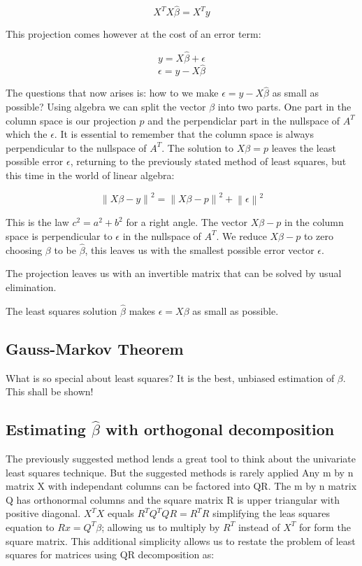 \documentclass{article}
\begin{document}
    \begin{equation} X^T X \widehat{\beta} = X^T y  \end{equation}

    This projection comes however at the cost of an error term:

    \begin{equation} y = X\widehat{\beta} + \epsilon  \end{equation}
    \begin{equation} \epsilon = y-X\widehat{\beta} \end{equation}

    The questions that now arises is: how to we make $\epsilon = y-X\widehat{\beta}$ as small as possible? Using algebra we can split the vector $\beta$ into two parts. One part in the column space is our projection $p$ and the perpendiclar part in the nullspace of $A^T$ which the $\epsilon$. It is essential to remember that the column space is always perpendicular to the nullspace of $A^T$. The solution to $X\beta = p$ leaves the least possible error $\epsilon$, returning to the previously stated method of least squares, but this time in the world of linear algebra:


     \begin{equation} \left \| X\beta -y \right \|^2 = \left \| X\beta - p \right \|^2 + \left \| \epsilon \right \|^2 \end{equation}

     This is the law $c^2 = a^2 + b^2$ for a right angle. The vector $X\beta-p$ in the column space is perpendicular to $\epsilon$ in the nullspace of $A^T$. We reduce $X\beta-p$ to zero choosing $\beta$ to be $\widehat{\beta}$, this leaves us with the smallest possible error vector $\epsilon$.

    The projection leaves us with an invertible matrix that can be solved by usual elimination.

    The least squares solution $\widehat{\beta}$ makes $\epsilon = X\beta$ as small as possible.



    \subsection{Gauss-Markov Theorem}
    What is so special about least squares? It is the best, unbiased estimation of $\beta$. This shall be shown!
    \subsection{Estimating $\widehat{\beta}$ with orthogonal decomposition}
    The previously suggested method lends a great tool to think about the univariate least squares technique. But the suggested methods is rarely applied
    Any m by n matrix X with independant columns can be factored into QR. The m by n matrix Q has orthonormal columns and the square matrix R is upper triangular with positive diagonal. $X^T X$ equals $R^T Q^T QR = R^T R$ simplifying the leas squares equation to $Rx = Q^T \beta$; allowing us to multiply by $R^T$ instead of $X^T$ for form the square matrix.  This additional simplicity allows us to restate the problem of least squares for matrices using QR decomposition as:
\end{document}
